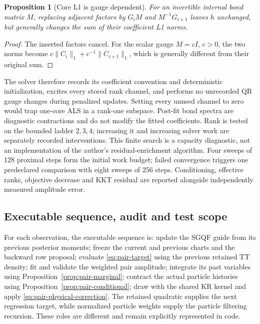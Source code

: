 \documentclass[11pt]{article}
\newtheorem{proposition}{Proposition}
\begin{document}
\begin{proposition}[Core L1 is gauge dependent]
\label{prop:pair-gauge}
For an invertible internal bond matrix $M$, replacing adjacent factors by
$G_iM$ and $M^{-1}G_{i+1}$ leaves $h$ unchanged, but generally changes the sum
of their coefficient L1 norms.
\end{proposition}
\begin{proof}
The inserted factors cancel. For the scalar gauge $M=cI$, $c>0$, the two
norms become $c\|C_i\|_1+c^{-1}\|C_{i+1}\|_1$, which is generally different
from their original sum.
\end{proof}

The solver therefore records its coefficient convention and deterministic
initialization, excites every stored rank channel, and performs no unrecorded
QR gauge changes during penalized updates. Setting every unused channel to
zero would trap one-core ALS in a rank-one subspace. Post-fit bond spectra
are diagnostic contractions and do not modify the fitted coefficients.
Rank is tested on the bounded ladder $2,3,4$; increasing it and increasing
solver work are separately recorded interventions. This finite search is a
capacity diagnostic, not an implementation of the author's residual-enrichment
algorithm. Four sweeps of 128 proximal steps form the initial work budget;
failed convergence triggers one predeclared comparison with eight sweeps of
256 steps. Conditioning, effective ranks, objective decrease and KKT residual
are reported alongside independently measured amplitude error.

\subsection{Executable sequence, audit and test scope}

For each observation, the executable sequence is: update the SGQF guide from
its previous posterior moments; freeze the current and previous charts and
the backward row proposal; evaluate \eqref{eq:pair-target} using the previous
retained TT density; fit and validate the weighted pair amplitude; integrate
its past variables using Proposition~\ref{prop:pair-marginal}; contract the
actual particle histories using Proposition~\ref{prop:pair-conditional}; draw
with the shared KR kernel and apply \eqref{eq:pair-physical-correction}.
The retained quadratic supplies the next regression target, while normalized
particle weights supply the particle filtering recursion. These roles are
different and remain explicitly represented in code.
\end{document}
